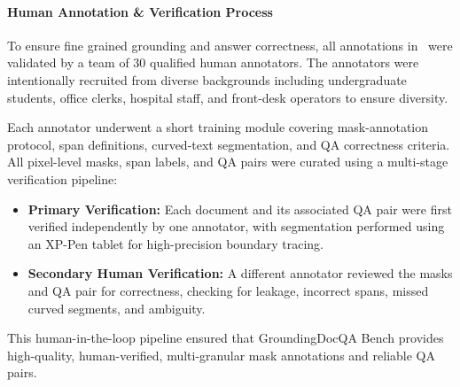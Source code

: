 


\paragraph{Human Annotation \& Verification Process}


To ensure fine grained  grounding and answer correctness, all annotations in \benchmarkName\ were validated by a team of 30 qualified human annotators. The annotators were intentionally recruited from diverse backgrounds including undergraduate students, office clerks, hospital staff, and front-desk operators to ensure diversity.

\noindent Each annotator underwent a short training module covering mask-annotation protocol, span definitions, curved-text segmentation, and QA correctness criteria. All pixel-level masks, span labels, and QA pairs were curated using a multi-stage verification pipeline:

\begin{itemize}
    \item \textbf{Primary Verification:} Each document and its associated QA pair were first verified independently by one annotator, with segmentation performed using an XP-Pen tablet for high-precision boundary tracing.
    \item \textbf{Secondary Human Verification:} A different annotator reviewed the masks and QA pair for correctness, checking for leakage, incorrect spans, missed curved segments, and ambiguity.
\end{itemize}

\noindent This human-in-the-loop pipeline ensured that GroundingDocQA Bench provides high-quality, human-verified, multi-granular mask annotations and reliable QA pairs.


